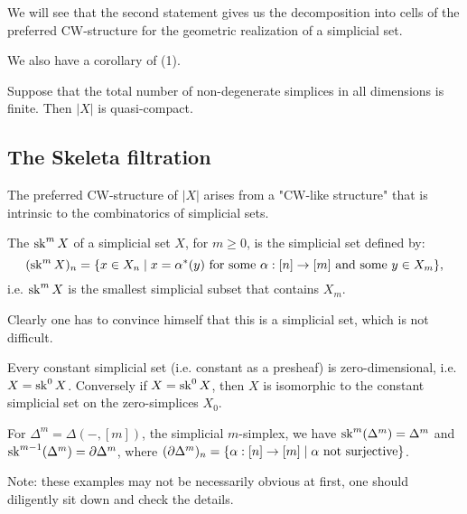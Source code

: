 We will see that the second statement gives us the decomposition into cells of the preferred CW-structure for the geometric realization of a simplicial set.

We also have a corollary of (1).

\begin{corollary}\label{corollary:criterion-for-compactness-of-realization}
Suppose that the total number of non-degenerate simplices in all dimensions is finite. Then $|X|$ is quasi-compact.
\end{corollary}

\subsection{The Skeleta filtration}

The preferred CW-structure of $|X|$ arises from a "CW-like structure" that is intrinsic to the combinatorics of simplicial sets.

The  $\operatorname{sk}^m X$ of a simplicial set $X$, for $m\ge0$, is the simplicial set defined by:
\[(\operatorname{sk}^m X)_n=\{x\in X_n\mid x=\alpha^*(y)\text{ for some }\alpha:[n]\to[m]\text{ and some }y\in X_m\},\]
i.e. $\operatorname{sk}^m X$ is the smallest simplicial subset that contains $X_m$.

Clearly one has to convince himself that this is a simplicial set, which is not difficult.

\begin{example}
Every constant simplicial set (i.e. constant as a presheaf) is zero-dimensional, i.e. $X=\operatorname{sk}^0 X$. Conversely if $X=\operatorname{sk}^0 X$, then $X$ is isomorphic to the constant simplicial set on the zero-simplices $X_0$.
\end{example}

\begin{example}
For $\Delta^m=\Delta(-,[m])$, the simplicial $m$-simplex, we have $\operatorname{sk}^m(\Delta^m)=\Delta^m$ and $\operatorname{sk}^{m-1}(\Delta^m)=\partial\Delta^m$, where $(\partial\Delta^m)_n=\{\alpha:[n]\to[m]\mid\alpha\text{ not surjective}\}$.
\end{example}

Note: these examples may not be necessarily obvious at first, one should diligently sit down and check the details.
